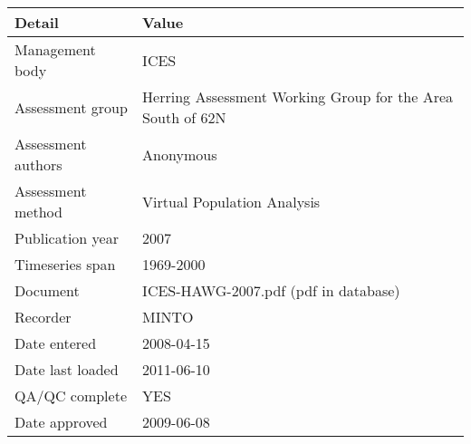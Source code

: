 \begin{table}[htb]
\centering
\begin{tabular}{lp{7cm}}
\toprule
Detail & Value \\
\midrule
Management body    & ICES                                                       \\
Assessment group   & Herring Assessment Working Group for the Area South of 62N \\
Assessment authors & Anonymous                                                  \\
Assessment method  & Virtual Population Analysis                                \\
Publication year   & 2007                                                       \\
Timeseries span    & 1969-2000                                                  \\
Document           & ICES-HAWG-2007.pdf (pdf in database)                       \\
Recorder           & MINTO                                                      \\
Date entered       & 2008-04-15                                                 \\
Date last loaded   & 2011-06-10                                                 \\
QA/QC complete     & YES                                                        \\
Date approved      & 2009-06-08                                                 \\
\bottomrule
\end{tabular}
\label{tab:assessdet}
\end{table}
